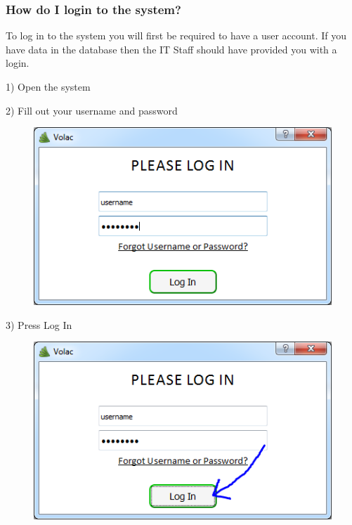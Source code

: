 \subsubsection{How do I login to the system?}

To log in to the system you will first be required to have a user account. If you have data in the database then the IT Staff should have provided you with a login.

1) Open the system

2) Fill out your username and password

\begin{figure}[H]
    \includegraphics[width=\textwidth]{./Manual/Images/login1.png}
\end{figure}

3) Press Log In

\begin{figure}[H]
    \includegraphics[width=\textwidth]{./Manual/Images/login2.png}
\end{figure}



